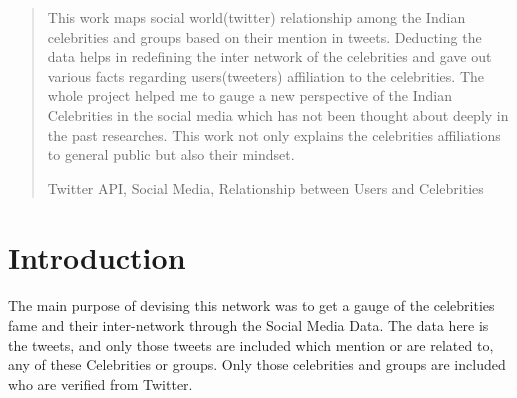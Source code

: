 \documentclass[runningheads,a4paper]{llncs}
\newcommand{\keywords}[1]{\par\addvspace\baselineskip
\noindent\keywordname\enspace\ignorespaces#1}
\begin{document}
\begin{abstract}
This work maps social world(twitter) relationship among the Indian celebrities and groups based on their mention in tweets. Deducting the data helps in redefining the inter network of the celebrities and gave out various facts regarding users(tweeters) affiliation to the celebrities. The whole project helped me to gauge a new perspective of the Indian Celebrities in the social media which has not been thought about deeply in the past researches. This work not only explains the celebrities affiliations to general public but also their mindset.

%

\keywords{Twitter API, Social Media, Relationship between Users and Celebrities}
\end{abstract}

\section{Introduction}

\paragraph{}
The main purpose of devising this network was to get a gauge of the celebrities fame and their inter-network through the Social Media Data. The data here is the tweets, and only those tweets are included which mention or are related to, any of these Celebrities or groups. Only those celebrities and groups are included who are verified from Twitter.
\end{document}
